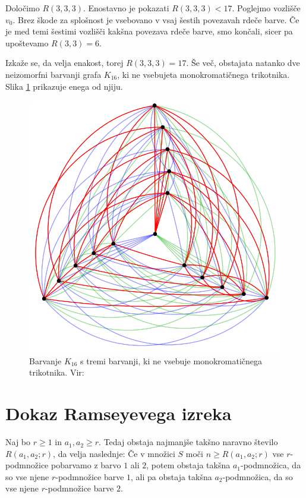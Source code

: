 \documentclass[twoside,11pt]{article}
\begin{document}
\begin{zgled}
    Določimo $R(3, 3, 3)$.
    Enostavno je pokazati $R(3,3,3) < 17$. Poglejmo vozlišče $v_0$. Brez škode za splošnost je vsebovano v vsaj šestih povezavah rdeče 
    barve. Če je med temi šestimi vozlišči kakšna povezava rdeče barve, smo končali, 
    sicer pa upoštevamo $R(3, 3) = 6$.

    Izkaže se, da velja enakost, torej $R(3, 3, 3) = 17$. Še več, obstajata natanko dve 
    neizomorfni barvanji grafa $K_{16}$, ki ne vsebujeta monokromatičnega trikotnika.
    Slika \ref{fig:r333} prikazuje enega od njiju.
    \begin{figure}[h!]
        \centering
        \includegraphics[scale=0.3]{r333.png}
        \caption{Barvanje $K_{16}$ s tremi barvanji, ki ne vsebuje monokromatičnega trikotnika. Vir: \cite{r333}}
        \label{fig:r333}
    \end{figure}
\end{zgled}

\section{Dokaz Ramseyevega izreka}

\begin{izrek}[Ramsey]
    Naj bo $r \ge 1$ in $a_1, a_2 \ge r$. Tedaj obstaja najmanjše takšno naravno število 
    $R(a_1, a_2; r)$, da velja naslednje: Če v množici $S$ moči $n \ge R(a_1, a_2; r)$
    vse $r$-podmnožice pobarvamo z barvo $1$ ali $2$, potem obstaja takšna $a_1$-podmnožica, 
    da so vse njene $r$-podmnožice barve $1$, ali pa obstaja takšna $a_2$-podmnožica, da so 
    vse njene $r$-podmnožice barve $2$. \label{izrek:ramsey}
\end{izrek}
\end{document}
